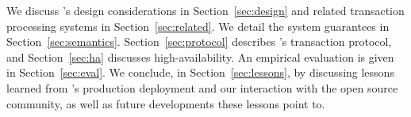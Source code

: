 We discuss \sys's design considerations in Section~\ref{sec:design}
and related transaction processing systems in Section~\ref{sec:related}.
We detail the system guarantees in Section~\ref{sec:semantics}. Section~\ref{sec:protocol} describes \sys's 
transaction protocol, and Section~\ref{sec:ha} discusses high-availability. An empirical evaluation is given 
in Section~\ref{sec:eval}. We conclude, in Section~\ref{sec:lessons}, by discussing lessons learned from \sys's production 
deployment and our interaction with the open source community, as well as future developments these lessons point to. 
